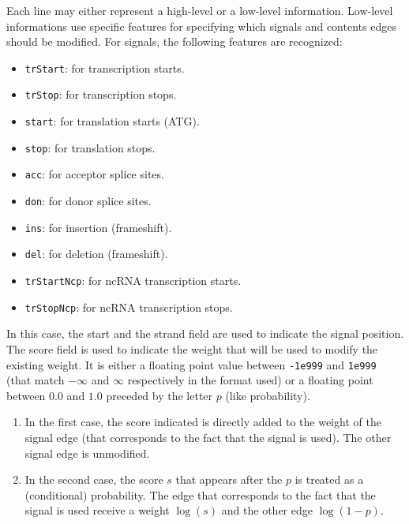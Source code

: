 Each line may either represent a high-level or a low-level
information.  Low-level informations use specific features for
specifying which signals and contents edges should be modified. For
signals, the following features are recognized:
\begin{itemize}
\item \texttt{trStart}: for transcription starts.
\item \texttt{trStop}: for transcription stops.
\item \texttt{start}: for translation starts (ATG).
\item \texttt{stop}: for translation stops.
\item \texttt{acc}: for acceptor splice sites.
\item \texttt{don}: for donor splice sites.
\item \texttt{ins}: for insertion (frameshift).
\item \texttt{del}: for deletion (frameshift).
\item \texttt{trStartNcp}: for ncRNA transcription starts.
\item \texttt{trStopNcp}: for ncRNA transcription stops.
\end{itemize}
In this case, the start and the strand field are used to indicate the
signal position. The score field is used to indicate the weight that
will be used to modify the existing weight. It is either a floating
point value between \texttt{-1e999} and \texttt{1e999} (that match
$-\infty$ and $\infty$ respectively in the format used) or a floating point
between $0.0$ and $1.0$ preceded by the letter $p$ (like probability).

\begin{enumerate}
\item In the first case, the score indicated is directly added to the
  weight of the signal edge (that corresponds to the fact that the
  signal is used). The other signal edge is unmodified.
\item In the second case, the score $s$ that appears after the $p$ is
  treated as a (conditional) probability. The edge that corresponds to
  the fact that the signal is used receive a weight $\log(s)$ and the
  other edge $\log(1-p)$.
\end{enumerate}

